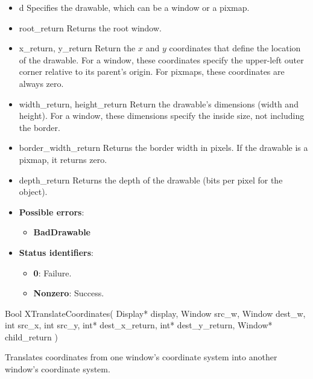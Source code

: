 \documentclass{report}
\begin{document}
\begin{itemize}
            \begin{itemize}
                \item d Specifies the drawable, which can be a window or a pixmap.
                \item root\_return Returns the root window.
                \item x\_return, y\_return Return the $x$ and $y$ coordinates that define the location of the drawable. For a window, these coordinates specify the upper-left outer corner relative to its parent’s origin. For pixmaps, these coordinates are always zero.
                \item width\_return, height\_return Return the drawable’s dimensions (width and height). For a window, these dimensions specify the inside size, not including the border.
                \item border\_width\_return Returns the border width in pixels. If the drawable is a pixmap, it returns zero.
                \item depth\_return Returns the depth of the drawable (bits per pixel for the object).
            \end{itemize}
            \begin{itemize}
                \item \textbf{Possible errors}:
                    \begin{itemize}
                        \item \textbf{BadDrawable}
                    \end{itemize}
                \item \textbf{Status identifiers}:
                    \begin{itemize}
                        \item \textbf{0}: Failure.
                        \item \textbf{Nonzero}: Success.
                    \end{itemize}
            \end{itemize}

            \begin{cppcode}
                Bool XTranslateCoordinates(
                    Display* display,
                    Window src_w, Window dest_w,
                    int src_x, int src_y,
                    int* dest_x_return, int* dest_y_return,
                    Window* child_return
            )
            \end{cppcode}
            \bigbreak \noindent
            Translates coordinates from one window’s coordinate system into another window’s coordinate system.


\end{itemize}
\end{document}
